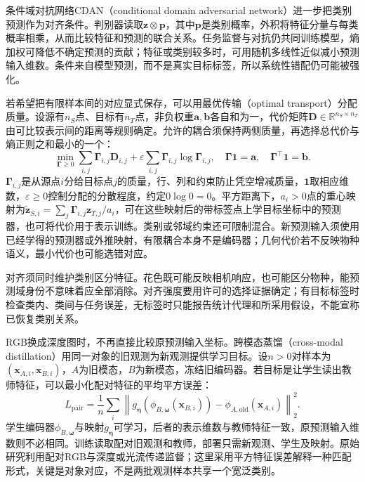 条件域对抗网络CDAN（conditional domain adversarial network）进一步把类别预测作为对齐条件。判别器读取$\bm z\otimes\bm p$，其中$\bm p$是类别概率，外积将特征分量与每类概率相乘，从而比较特征和预测的联合关系。任务监督与对抗仍共同训练模型，熵加权可降低不确定预测的贡献；特征或类别较多时，可用随机多线性近似减小预测输入维数。条件来自模型预测，而不是真实目标标签，所以系统性错配仍可能被强化。

若希望把有限样本间的对应显式保存，可以用最优传输（optimal transport）分配质量。设源有$n_S$点、目标有$n_T$点，非负权重$\bm a,\bm b$各自和为一，代价矩阵$\bm D\in\mathbb R^{n_S\times n_T}$由可比较表示间的距离等规则确定。允许的耦合须保持两侧质量，再选择总代价与熵正则之和最小的一个：
\begin{equation}
\min_{\bm\Gamma\ge0}
\sum_{i,j}\bm\Gamma_{i,j}\bm D_{i,j}
+\varepsilon\sum_{i,j}\bm\Gamma_{i,j}\log\bm\Gamma_{i,j},
\quad
\bm\Gamma\bm 1=\bm a,\quad
\bm\Gamma^\top\bm1=\bm b.
\label{eq:ket-update-transport}
\end{equation}
$\bm\Gamma_{i,j}$是从源点$i$分给目标点$j$的质量，行、列和约束防止凭空增减质量，$\bm1$取相应维数，$\varepsilon\geq0$控制分配的分散程度，约定$0\log0=0$。平方距离下，$a_i>0$点的重心映射为$\tilde{\bm z}_{S,i}=\sum_j\bm\Gamma_{i,j}\bm z_{T,j}/a_i$，可在这些映射后的带标签点上学目标坐标中的预测器，也可将代价用于表示训练。类别或邻域约束还可限制混合。新预测输入须使用已经学得的预测器或外推映射，有限耦合本身不是编码器；几何代价若不反映物种语义，最小代价也可能选错对应。

对齐须同时维护类别区分特征。花色既可能反映相机响应，也可能区分物种，能预测域身份不意味着应全部消除。对齐强度要用许可的选择证据确定；有目标标签时检查类内、类间与任务误差，无标签时只能报告统计代理和所采用假设，不能宣称已恢复类别关系。

RGB换成深度图时，不再直接比较原预测输入坐标。跨模态蒸馏（cross-modal distillation）用同一对象的旧观测为新观测提供学习目标。设$n>0$对样本为$(\bm x_{A,i},\bm x_{B,i})$，$A$为旧模态，$B$为新模态，冻结旧编码器。若目标是让学生读出教师特征，可以最小化配对特征的平均平方误差：
\begin{equation}
L_{\mathrm{pair}}
=\frac1n\sum_i
\left\lVert g_{\bm\eta}(\phi_{B,\bm\omega}(\bm x_{B,i}))
-\phi_{A,\mathrm{old}}(\bm x_{A,i})\right\rVert_2^2.
\label{eq:ket-update-crossmodal}
\end{equation}
学生编码器$\phi_{B,\bm\omega}$与映射$g_{\bm\eta}$可学习，后者的表示维数与教师特征一致，原预测输入维数则不必相同。训练读取配对旧观测和教师，部署只需新观测、学生及映射。原始研究利用配对RGB与深度或光流传递监督；这里采用平方特征误差解释一种匹配形式，关键是对象对应，不是两批观测样本共享一个宽泛类别。

